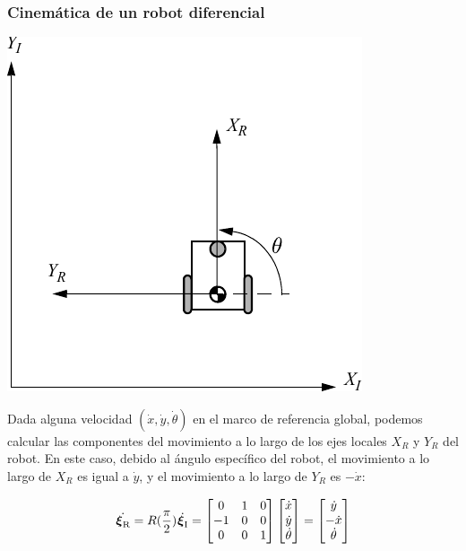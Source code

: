 \begin{frame}
    \frametitle{Cinemática de un robot diferencial}

    \begin{center}
        \includegraphics[width=0.2\columnwidth]{./images/coordinate_frame_rotation.pdf}
    \end{center}

    Dada alguna velocidad $(\dot{x}, \dot{y}, \dot{\theta})$ en el marco de referencia global, podemos calcular las componentes del movimiento a lo largo de los ejes locales $X_R$ y $Y_R$ del robot. En este caso, debido al ángulo específico del robot, el movimiento a lo largo de $X_R$ es igual a $\dot{y}$, y el movimiento a lo largo de $Y_R$ es $-\dot{x}$:

    \begin{equation*}
        \dot{\prescript{\mathrm{}}{}{{\boldsymbol{\mathbf{\xi}}}_\mathrm{R}}} = R(\frac{\pi}{2})\dot{\prescript{\mathrm{}}{}{{\boldsymbol{\mathbf{\xi}}}_\mathrm{I}}} =
        \begin{bmatrix}
            0 & 1 & 0 \\
            -1 & 0 & 0 \\
            0 & 0 & 1
        \end{bmatrix}
        \begin{bmatrix}
            \dot{x}\\
            \dot{y}\\
            \dot{\theta}
        \end{bmatrix}
         =
        \begin{bmatrix}
            \dot{y}\\
            -\dot{x}\\
            \dot{\theta}
        \end{bmatrix}
    \end{equation*}
\end{frame}

